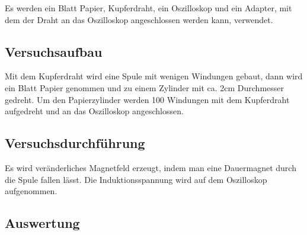 \documentclass[12pt,a4paper]{article}
\begin{document}
Es werden ein Blatt Papier, Kupferdraht, ein Oszilloskop und ein Adapter, mit dem der Draht an das Oszilloskop angeschlossen werden kann, verwendet.


\subsection*{Versuchsaufbau}

Mit dem Kupferdraht wird eine Spule mit wenigen Windungen gebaut, dann wird ein Blatt Papier genommen und zu einem Zylinder mit ca. 2cm Durchmesser gedreht. Um den Papierzylinder werden 100 Windungen mit dem Kupferdraht aufgedreht und an das Oszilloskop angeschlossen.


\subsection*{Versuchsdurchführung}

Es wird veränderliches Magnetfeld erzeugt, indem man eine Dauermagnet durch die Spule fallen lässt. Die Induktionsspannung wird auf dem Oszilloskop aufgenommen.


\subsection*{Auswertung}
\end{document}
